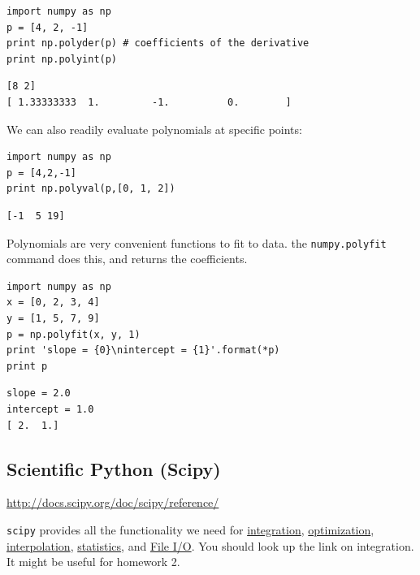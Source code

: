\documentclass[11pt]{article}
\begin{document}
\begin{verbatim}
import numpy as np
p = [4, 2, -1]
print np.polyder(p) # coefficients of the derivative
print np.polyint(p)
\end{verbatim}

\begin{verbatim}
[8 2]
[ 1.33333333  1.         -1.          0.        ]
\end{verbatim}

We can also readily evaluate polynomials at specific points:
\begin{verbatim}
import numpy as np
p = [4,2,-1]
print np.polyval(p,[0, 1, 2])
\end{verbatim}

\begin{verbatim}
[-1  5 19]
\end{verbatim}

Polynomials are very convenient functions to fit to data. the \texttt{numpy.polyfit} command does this, and returns the coefficients.

\begin{verbatim}
import numpy as np
x = [0, 2, 3, 4]
y = [1, 5, 7, 9]
p = np.polyfit(x, y, 1)
print 'slope = {0}\nintercept = {1}'.format(*p)
print p
\end{verbatim}

\begin{verbatim}
slope = 2.0
intercept = 1.0
[ 2.  1.]
\end{verbatim}


\subsection{Scientific Python (Scipy)}
\label{sec:org3ec3e74}
\url{http://docs.scipy.org/doc/scipy/reference/}

\texttt{scipy} provides all the functionality we need for \href{http://docs.scipy.org/doc/scipy/reference/tutorial/integrate.html}{integration}, \href{http://docs.scipy.org/doc/scipy/reference/tutorial/optimize.html}{optimization}, \href{http://docs.scipy.org/doc/scipy/reference/tutorial/interpolate.html}{interpolation}, \href{http://docs.scipy.org/doc/scipy/reference/tutorial/stats.html}{statistics}, and \href{http://docs.scipy.org/doc/scipy/reference/tutorial/io.html}{File I/O}. You should look up the link on integration. It might be useful for homework 2.
\end{document}
